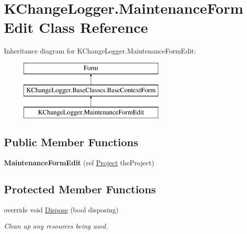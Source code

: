 \hypertarget{class_k_change_logger_1_1_maintenance_form_edit}{\section{K\-Change\-Logger.\-Maintenance\-Form\-Edit Class Reference}
\label{class_k_change_logger_1_1_maintenance_form_edit}
}
Inheritance diagram for K\-Change\-Logger.\-Maintenance\-Form\-Edit\-:\begin{figure}[H]
\begin{center}
\leavevmode
\includegraphics[height=3.000000cm]{class_k_change_logger_1_1_maintenance_form_edit}
\end{center}
\end{figure}
\subsection*{Public Member Functions}
\begin{DoxyCompactItemize}
\item 
\hypertarget{class_k_change_logger_1_1_maintenance_form_edit_a43e37252615325d98f4c414b3f928290}{{\bfseries Maintenance\-Form\-Edit} (ref \hyperlink{class_k_change_logger_1_1_project}{Project} the\-Project)}\label{class_k_change_logger_1_1_maintenance_form_edit_a43e37252615325d98f4c414b3f928290}

\end{DoxyCompactItemize}
\subsection*{Protected Member Functions}
\begin{DoxyCompactItemize}
\item 
override void \hyperlink{class_k_change_logger_1_1_maintenance_form_edit_ae3ce9ebaa1eeffff67c833130c1868f0}{Dispose} (bool disposing)
\begin{DoxyCompactList}\small\item\em Clean up any resources being used. \end{DoxyCompactList}\end{DoxyCompactItemize}
